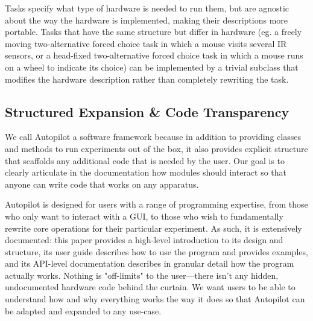 \documentclass[nohyper, justified, notitlepage, marginals=raggedright,twoside=false,debug]{tufte-autopilot}
\begin{document}
Tasks specify what type of hardware is needed to run them, but are agnostic about the way the hardware is implemented, making their descriptions more portable. Tasks that have the same structure but differ in hardware (eg. a freely moving two-alternative forced choice task in which a mouse visits several IR sensors, or a head-fixed two-alternative forced choice task in which a mouse runs on a wheel to indicate its choice) can be implemented by a trivial subclass that modifies  the hardware description rather than completely rewriting the task.

\subsection{Structured Expansion \& Code Transparency}
\label{sec:expansion}

We call Autopilot a software framework because in addition to providing classes and methods to run experiments out of the box, it also provides explicit structure that scaffolds any additional code that is needed by the user. Our goal is to clearly articulate in the documentation how modules should interact so that anyone can write code that works on any apparatus. 

Autopilot is designed for users with a range of programming expertise, from those who only want to interact with a GUI, to those who wish to fundamentally rewrite core operations for their particular experiment. As such, it is extensively documented: this paper provides a high-level introduction to its design and structure, its user guide describes how to use the program and provides examples, and its API-level documentation describes in granular detail how the program actually works. Nothing is "off-limits" to the user---there isn't any hidden, undocumented hardware code behind the curtain. We want users to be able to understand how and why everything works the way it does so that Autopilot can be adapted and expanded to any use-case.
\end{document}
